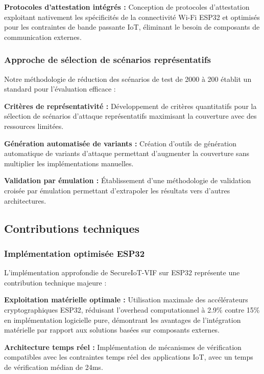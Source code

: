 \textbf{Protocoles d'attestation intégrés :} Conception de protocoles d'attestation exploitant nativement les spécificités de la connectivité Wi-Fi ESP32 et optimisés pour les contraintes de bande passante IoT, éliminant le besoin de composants de communication externes.

\subsubsection{Approche de sélection de scénarios représentatifs}

Notre méthodologie de réduction des scénarios de test de 2000 à 200 établit un standard pour l'évaluation efficace :

\textbf{Critères de représentativité :} Développement de critères quantitatifs pour la sélection de scénarios d'attaque représentatifs maximisant la couverture avec des ressources limitées.

\textbf{Génération automatisée de variants :} Création d'outils de génération automatique de variants d'attaque permettant d'augmenter la couverture sans multiplier les implémentations manuelles.

\textbf{Validation par émulation :} Établissement d'une méthodologie de validation croisée par émulation permettant d'extrapoler les résultats vers d'autres architectures.

\subsection{Contributions techniques}

\subsubsection{Implémentation optimisée ESP32}

L'implémentation approfondie de SecureIoT-VIF sur ESP32 représente une contribution technique majeure :

\textbf{Exploitation matérielle optimale :} Utilisation maximale des accélérateurs cryptographiques ESP32, réduisant l'overhead computationnel à 2.9\% contre 15\% en implémentation logicielle pure, démontrant les avantages de l'intégration matérielle par rapport aux solutions basées sur composants externes.

\textbf{Architecture temps réel :} Implémentation de mécanismes de vérification compatibles avec les contraintes temps réel des applications IoT, avec un temps de vérification médian de 24ms.

